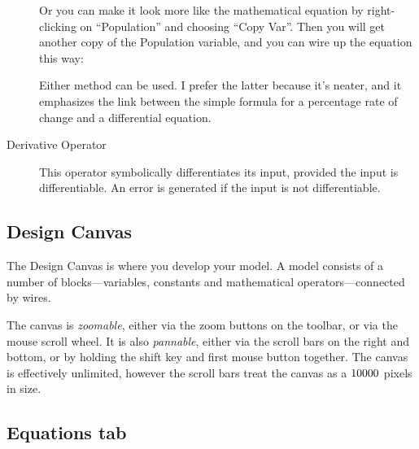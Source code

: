 \begin{description}
Or you can make it look more like the mathematical equation by right-clicking
on ``Population'' and choosing ``Copy Var''. Then you will get
another copy of the Population variable, and you can wire up the equation
this way:
\begin{center}
\par\end{center}

Either method can be used. I prefer the latter because it's neater,
and it emphasizes the link between the simple formula for a percentage
rate of change and a differential equation.
\item [{Derivative Operator}]  This operator
symbolically differentiates its input, provided the input is differentiable.
An error is generated if the input is not differentiable.
\end{description}

\subsection{Design Canvas}

\label{DesignCanvas}\label{tabs:Wiring}

The Design Canvas is where you develop your model. A model consists
of a number of blocks---variables, constants and mathematical operators---connected
by wires.

The canvas is {\em zoomable}, either via the zoom buttons on the
toolbar, or via the mouse scroll wheel. It is also {\em pannable},
either via the scroll bars on the right and bottom, or by holding
the shift key and first mouse button together. The canvas is effectively
unlimited, however the scroll bars treat the canvas as a $10000\time10000$
pixels in size.


\subsection{Equations tab}

